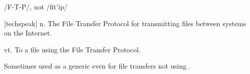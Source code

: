  /F-T-P/, not /fit'ip/

\begin{inparaenum}
	\item {[}techspeak] n. The File Transfer Protocol for transmitting files between systems on the Internet.
	\item vt. To  a file using the File Transfer Protocol.
	\item Sometimes used as a generic even for file transfers not using .
\end{inparaenum}

